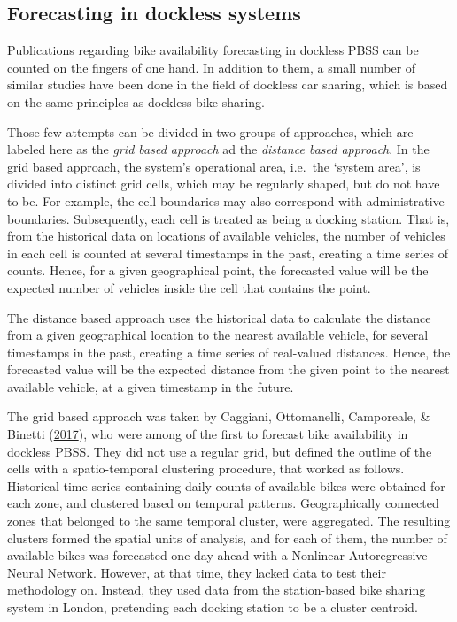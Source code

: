 \documentclass[12pt,oneside]{reedthesis}
\begin{document}
\subsection{Forecasting in dockless systems}\label{onethreetwo}

Publications regarding bike availability forecasting in dockless PBSS
can be counted on the fingers of one hand. In addition to them, a small
number of similar studies have been done in the field of dockless car
sharing, which is based on the same principles as dockless bike sharing.

Those few attempts can be divided in two groups of approaches, which are
labeled here as the \emph{grid based approach} ad the \emph{distance
based approach}. In the grid based approach, the system's operational
area, i.e.~the `system area', is divided into distinct grid cells, which
may be regularly shaped, but do not have to be. For example, the cell
boundaries may also correspond with administrative boundaries.
Subsequently, each cell is treated as being a docking station. That is,
from the historical data on locations of available vehicles, the number
of vehicles in each cell is counted at several timestamps in the past,
creating a time series of counts. Hence, for a given geographical point,
the forecasted value will be the expected number of vehicles inside the
cell that contains the point.

The distance based approach uses the historical data to calculate the
distance from a given geographical location to the nearest available
vehicle, for several timestamps in the past, creating a time series of
real-valued distances. Hence, the forecasted value will be the expected
distance from the given point to the nearest available vehicle, at a
given timestamp in the future.

The grid based approach was taken by Caggiani, Ottomanelli, Camporeale,
\& Binetti (\protect\hyperlink{ref-caggiani2017}{2017}), who were among
of the first to forecast bike availability in dockless PBSS. They did
not use a regular grid, but defined the outline of the cells with a
spatio-temporal clustering procedure, that worked as follows. Historical
time series containing daily counts of available bikes were obtained for
each zone, and clustered based on temporal patterns. Geographically
connected zones that belonged to the same temporal cluster, were
aggregated. The resulting clusters formed the spatial units of analysis,
and for each of them, the number of available bikes was forecasted one
day ahead with a Nonlinear Autoregressive Neural Network. However, at
that time, they lacked data to test their methodology on. Instead, they
used data from the station-based bike sharing system in London,
pretending each docking station to be a cluster centroid.
\end{document}
